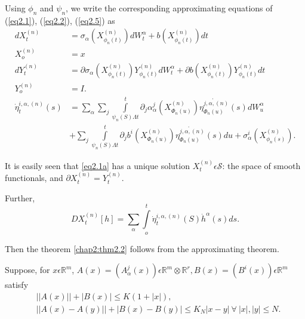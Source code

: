 Using $\phi_n$ and $\psi_n$, we write the corresponding approximating
equations of (\ref{eq2.1}), (\ref{eq2.2}), (\ref{eq2.5}) as  
\begin{align*} 
  dX^{(n)}_t &= \sigma_\alpha \left(X_{\phi_n (t)}^{(n)}\right)dW^\alpha_t +
  b \left(X_{\phi_n (t)}^{(n)}\right)dt \tag*{(2.1)a}\label{eq2.1a} \\
  X_o^{(n)}& =x\\
  dY^{(n)}_t &=  \partial\sigma_\alpha \left(X_{\phi_n (t)}^{(n)}\right)
  Y_{\phi_n (t)}^{(n)} dW^\alpha_t + \partial b
  \left(X_{\phi_n (t)}^{(n)}\right)
  Y_{\phi_n (t)}^{(n)} {dt} \tag*{(2.2)a}\label{eq2.2a}\\ 
  Y_o^{(n)}& = I.\\
  \dot{\eta}^{i,\alpha, (n)}_t (s) & = \sum_{\alpha} \sum_{j}
  \int\limits_{\psi_n(S) \Lambda t}^t \partial_j  \alpha^j_\alpha
  \left(X^{(n)}_{\Phi_n (u)}\right) \dot{\eta^{j, \alpha, (n)}_{\Phi_n
      {(u)}}}  (s) dW^\alpha_u\\ 
  & +  \sum_{j} \int\limits_{\psi_n (S) \Lambda t}^t
  \partial_j  b^i \left(X^{(n)}_{\Phi_n {(u)}}\right) \dot{\eta^{j, \alpha,
      (n)}_{\Phi_n {(u)}}} (s) du +
  \sigma^i_\alpha \left(X^{(n)}_{\phi_n
    {(s)}}\right). \tag*{(2.5)a}\label{eq2.5a}  
\end{align*}\pageoriginale

It is easily seen that \ref{eq2.1a} has a unique solution $X_t^{(n)}
\epsilon  \mathcal{S}$: the space of smooth functionals, and
$\partial X_{t}^{(n)}= Y^{(n)}_t$. 

Further,
$$
DX^{(n)}_t [h]= \sum_\alpha \int\limits_{o}^t \dot{\eta}^{i, \alpha,
  (n)}_{t} (S) \dot{h}^{\alpha}(s) ds. 
$$  

Then the theorem \ref{chap2:thm2.2} follows from the approximating theorem. 

\begin{theorem}\label{chap2:thm2.3}%
  Suppose, for $x \epsilon  \mathbb{R}^m$, $A(x)= (A^j_\alpha(x))
  \epsilon  \mathbb{R}^m \otimes \mathbb{R}^r, B(x) = (B^i (x))
  \epsilon  \mathbb{R}^m$ satisfy 
  \begin{align*}
    &|| A(x) || + |B(x)| \le K(1+ |x|),\\
    &|| A(x) - A(y) || +  |B(x)- B(y)| \le K_N| x-y| ~\forall~ |x|, |y|  \le N.
  \end{align*}
 \end{theorem} 
 
